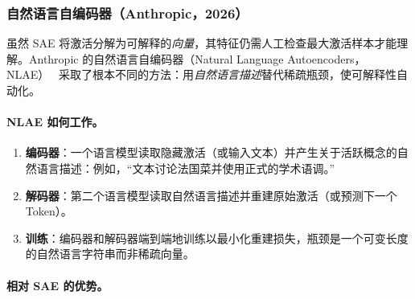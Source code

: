 \subsubsection{自然语言自编码器（Anthropic，2026）}
\label{natural-language-autoencoders-anthropic-2026}

虽然 SAE 将激活分解为可解释的\emph{向量}，其特征仍需人工检查最大激活样本才能理解。Anthropic 的自然语言自编码器（Natural Language Autoencoders，NLAE）~\cite{anthropic2026nla} 采取了根本不同的方法：用\emph{自然语言描述}替代稀疏瓶颈，使可解释性自动化。

\paragraph{NLAE 如何工作。}
\label{how-nlaes-work.}

\begin{enumerate}
  \item \textbf{编码器}：一个语言模型读取隐藏激活（或输入文本）并产生关于活跃概念的自然语言描述：例如，``文本讨论法国菜并使用正式的学术语调。''
  \item \textbf{解码器}：第二个语言模型读取自然语言描述并重建原始激活（或预测下一个 Token）。
  \item \textbf{训练}：编码器和解码器端到端地训练以最小化重建损失，瓶颈是一个可变长度的自然语言字符串而非稀疏向量。
\end{enumerate}

\paragraph{相对 SAE 的优势。}
\label{advantages-over-saes.}

